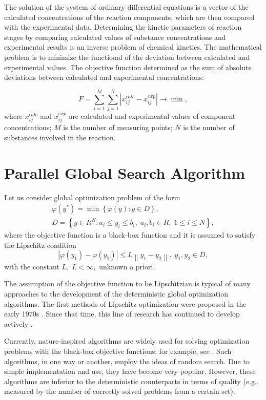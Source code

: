\documentclass{svproc}
\begin{document}
The solution of the system of ordinary differential equations is a vector of the calculated concentrations of the reaction components, which are then compared with the experimental data.
Determining the kinetic parameters of reaction stages by comparing calculated values of substance concentrations and experimental results is an inverse problem of chemical kinetics. The mathematical problem is to minimize the functional of the deviation between calculated and experimental values. The objective function determined as the sum of absolute deviations between calculated and experimental concentrations:

\begin{equation}\label{func}
F = \sum\limits_{i=1}^M \sum\limits_{j=1}^N \left| x_{ij}^{calc} - x_{ij}^{exp} \right| \rightarrow \min,
\end{equation}
where $x_{ij}^{calc}$ and $x_{ij}^{exp}$ are calculated and experimental values of component concentrations; $M$ is the number of measuring points; $N$ is the number of substances involved in the reaction.

\section{Parallel Global Search Algorithm}\label{Sec_GSA}

Let us consider global optimization problem of the form 
\begin{gather}
 \varphi(y^\ast)=\min{\left\{\varphi(y):y\in D\right\}}, \label{problem}\\
 D=\left\{y\in R^N: a_i\leq y_i \leq b_i, \; a_i,b_i\in R, \;  1\leq i \leq N\right\} \label{D},
\end{gather}
where the objective function is a black-box function and it is assumed to satisfy the Lipschitz condition
\[
\left|\varphi(y_1)-\varphi(y_2)\right|\leq L\left\|y_1-y_2\right\|,\; y_1,y_2 \in D,
\]
with the constant $L, \; L<\infty,$ unknown a priori.

The assumption of the objective function to be Lipschitzian is typical of many approaches to the development of the deterministic global optimization algorithms.
The first methods of Lipschitz optimization were proposed in the early 1970s \cite{Piyavskii1972,Shubert1972}. Since that time, this line of research has continued to develop actively \cite{Evtushenko2013,Zilinskas2010,Pinter1996,Jones2009}.

Currently, nature-inspired algorithms are widely used for solving optimization problems with the black-box objective functions; for example, see \cite{Yang2013,Gendreau2010,Eiben2015}. Such algorithms, in one way or another, employ the ideas of random search. Due to simple implementation and use, they have become very popular. However, these algorithms are inferior to the deterministic counterparts in terms of quality \cite{Kvasov2018,Sergeyev2018} (e.g., measured by the number of correctly solved problems from a certain set).
\end{document}
